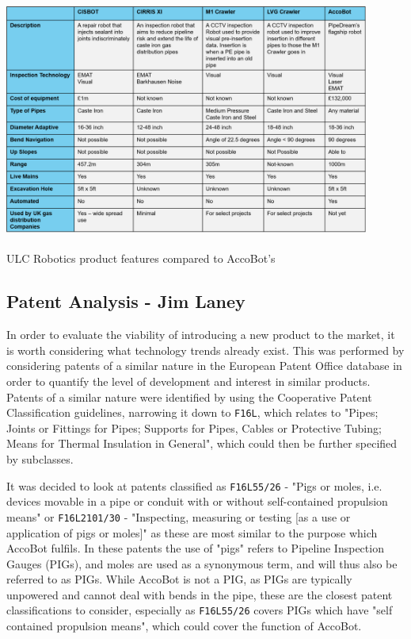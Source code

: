 \documentclass[11pt]{article}		%
\newcommand{\supercite}[1]{\textsuperscript{\cite{#1}}}		%
\begin{document}
            \begin{table}[h]
				\centering
				\includegraphics[width=0.9\textwidth]{ULC_robot_comparison_formatted}
				\caption{ULC Robotics product features compared to AccoBot's\supercite{ULC_Robots}}
				\label{ULCFeatures}
			\end{table}
        
	\subsection[Patent Analysis]{Patent Analysis - Jim Laney} \label{patentAnalysis}
        
        In order to evaluate the viability of introducing a new product to the market, it is worth considering what technology trends already exist.
        This was performed by considering patents of a similar nature in the European Patent Office database in order to quantify the level of development and interest in similar products.
        Patents of a similar nature were identified by using the Cooperative Patent Classification guidelines, narrowing it down to \verb|F16L|, which relates to "Pipes; Joints or Fittings for Pipes; Supports for Pipes, Cables or Protective Tubing; Means for Thermal Insulation in General"\cite{cpcSearch}, which could then be further specified by subclasses.
        
		It was decided to look at patents classified as \verb|F16L55/26| - "Pigs or moles, i.e. devices movable in a pipe or conduit with or without self-contained propulsion means" or \verb|F16L2101/30| - "Inspecting, measuring or testing [as a use or application of pigs or moles]" as these are most similar to the purpose which AccoBot fulfils.
		In these patents the use of "pigs" refers to Pipeline Inspection Gauges (PIGs), and moles are used as a synonymous term, and will thus also be referred to as PIGs.
		While AccoBot is not a PIG, as PIGs are typically unpowered and cannot deal with bends in the pipe, these are the closest patent classifications to consider, especially as \verb|F16L55/26| covers PIGs which have "self contained propulsion means", which could cover the function of AccoBot.
		
\end{document}
